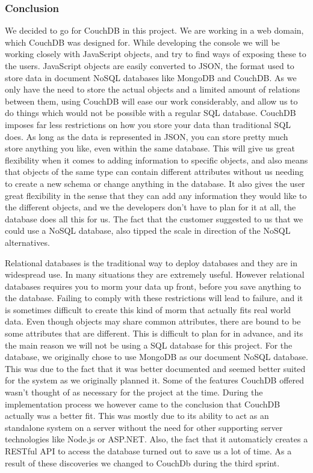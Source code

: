 \subsubsection{Conclusion}
We decided to go for CouchDB in this project. We are working in a web domain, which CouchDB was designed for. While developing the console we will be working closely with JavaScript objects, and try to find ways of exposing these to the users. JavaScript objects are easily converted to JSON, the format used to store data in document NoSQL databases like MongoDB and CouchDB.  As we only have the need to store the actual objects and a limited amount of relations between them, using CouchDB will ease our work considerably, and allow us to do things which would not be possible with a regular SQL database. CouchDB imposes far less restrictions on how you store your data than traditional SQL does. As long as the data is represented in JSON, you can store pretty much store anything you like, even within the same database. This will give us great flexibility when it comes to adding information to specific objects, and also means that objects of the same type can contain different attributes without us needing to create a new schema or change anything in the database. It also gives the user great flexibility in the sense that they can add any information they would like to the different objects, and we the developers don't have to plan for it at all, the database does all this for us. The fact that the customer suggested to us that we could use a NoSQL database, also tipped the scale in direction of the NoSQL alternatives.

Relational databases is the traditional way to deploy databases and they are in widespread use. In many situations they are extremely useful. However relational databases requires you to morm your data up front, before you save anything to the database. Failing to comply with these restrictions will lead to failure, and it is sometimes difficult to create this kind of morm that actually fits real world data. Even though objects may share common attributes, there are bound to be some attributes that are different. This is difficult to plan for in advance, and its the main reason we will not be using a SQL database for this project. For the database, we originally chose to use MongoDB as our document NoSQL database. This was due to the fact that it was better documented and seemed better suited for the system as we originally planned it. Some of the features CouchDB offered wasn't thought of as necessary for the project at the time. During the implementation process we however came to the conclusion that CouchDB actually was a better fit. This was mostly due to its ability to act as an standalone system on a server without the need for other supporting server technologies like Node.js or ASP.NET. Also, the fact that it automaticly creates a RESTful API to access the database turned out to save us a lot of time. As a result of these discoveries we changed to CouchDb during the third sprint.


